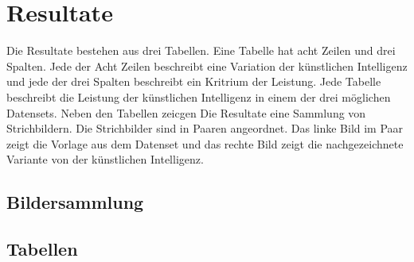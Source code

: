 \chapter{Resultate}
Die Resultate bestehen aus drei Tabellen. Eine Tabelle hat acht Zeilen und drei
Spalten. Jede der Acht Zeilen beschreibt eine Variation der künstlichen
Intelligenz und jede der drei Spalten beschreibt ein Kritrium der Leistung. Jede
Tabelle beschreibt die Leistung der künstlichen Intelligenz in einem der drei
möglichen Datensets. Neben den Tabellen zeicgen Die Resultate eine Sammlung von
Strichbildern. Die Strichbilder sind in Paaren angeordnet. Das linke Bild im
Paar zeigt die Vorlage aus dem Datenset und das rechte Bild zeigt die
nachgezeichnete Variante von der künstlichen Intelligenz.

\section{Bildersammlung}

\section{Tabellen}









